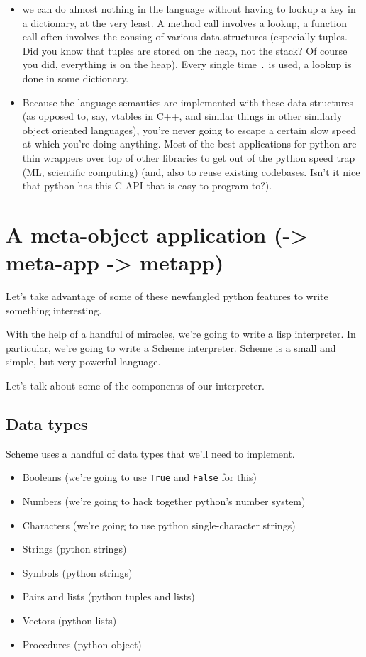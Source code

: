 \documentclass[11pt]{article}
\begin{document}
\begin{itemize}
\item we can do almost nothing in the language without having to lookup
a key in a dictionary, at the very least. A method call involves a
lookup, a function call often involves the consing of various data
structures (especially tuples. Did you know that tuples are stored
on the heap, not the stack? Of course you did, everything is on
the heap). Every single time \texttt{.} is used, a lookup is done in some
dictionary.
\item Because the language semantics are implemented with these data
structures (as opposed to, say, vtables in C++, and similar things
in other similarly object oriented languages), you're never
going to escape a certain slow speed at which you're doing
anything. Most of the best applications for python are thin
wrappers over top of other libraries to get out of the python
speed trap (ML, scientific computing) (and, also to reuse existing
codebases. Isn't it nice that python has this C API that is easy
to program to?).
\end{itemize}

\section{A meta-object application (-> meta-app -> metapp)}
\label{sec:orge8e0d7c}
Let's take advantage of some of these newfangled python features to
write something interesting. 

With the help of a handful of miracles, we're going to write a lisp
interpreter. In particular, we're going to write a Scheme
interpreter. Scheme is a small and simple, but very powerful
language.

Let's talk about some of the components of our interpreter.

\subsection{Data types}
\label{sec:org49b95de}
Scheme uses a handful of data types that we'll need to implement.

\begin{itemize}
\item Booleans (we're going to use \texttt{True} and \texttt{False} for this)
\item Numbers (we're going to hack together python's number system)
\item Characters (we're going to use python single-character strings)
\item Strings (python strings)
\item Symbols (python strings)
\item Pairs and lists (python tuples and lists)
\item Vectors (python lists)
\item Procedures (python object)
\end{itemize}
\end{document}
